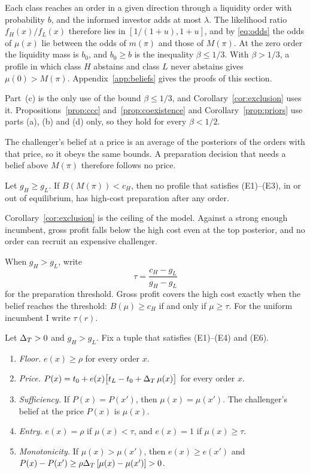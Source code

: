 Each class reaches an order in a given direction through a liquidity order with probability \(b\), and the
informed investor adds at most \(\lambda\). The likelihood ratio \(f_H(x)/f_L(x)\) therefore lies in
\([1/(1+u),1+u]\), and by \eqref{eq:odds} the odds of \(\mu(x)\) lie between the odds of \(m(\pi)\) and those of
\(M(\pi)\). At the zero order the liquidity mass is \(b_0\), and \(b_0\ge b\) is the inequality \(\beta\le1/3\).
With \(\beta>1/3\), a profile in which class \(H\) abstains and class \(L\) never abstains gives \(\mu(0)>M(\pi)\).
Appendix~\ref{app:beliefs} gives the proofs of this section.

Part~(c) is the only use of the bound \(\beta\le1/3\), and Corollary~\ref{cor:exclusion} uses it.
Propositions~\ref{prop:ccc} and~\ref{prop:coexistence} and Corollary~\ref{prop:priors} use parts (a), (b) and (d)
only, so they hold for every \(\beta<1/2\).

The challenger's belief at a price is an average of the posteriors of the orders with that price, so it obeys the
same bounds. A preparation decision that needs a belief above \(M(\pi)\) therefore follows no price.

\begin{corollary}\label{cor:exclusion}
Let \(g_H\ge g_L\). If \(B(M(\pi))<c_H\), then no profile that satisfies (E1)--(E3), in or out of equilibrium,
has high-cost preparation after any order.
\end{corollary}

Corollary~\ref{cor:exclusion} is the ceiling of the model. Against a strong enough incumbent, gross profit falls
below the high cost even at the top posterior, and no order can recruit an expensive challenger.

When \(g_H>g_L\), write
\[
\tau=\frac{c_H-g_L}{g_H-g_L}
\]
for the preparation threshold. Gross profit covers the high cost exactly when the belief reaches the threshold:
\(B(\mu)\ge c_H\) if and only if \(\mu\ge\tau\). For the uniform incumbent I write \(\tau(r)\).

\begin{lemma}\label{lem:prices}
Let \(\Delta_T>0\) and \(g_H>g_L\). Fix a tuple that satisfies (E1)--(E4) and (E6).
\begin{enumerate}[label=(\alph*),leftmargin=2em]
\item \emph{Floor.} \(e(x)\ge\rho\) for every order \(x\).
\item \emph{Price.} \(P(x)=t_0+e(x)\bigl[t_L-t_0+\Delta_T\,\mu(x)\bigr]\) for every order \(x\).
\item \emph{Sufficiency.} If \(P(x)=P(x')\), then \(\mu(x)=\mu(x')\). The challenger's belief at the price \(P(x)\)
is \(\mu(x)\).
\item \emph{Entry.} \(e(x)=\rho\) if \(\mu(x)<\tau\), and \(e(x)=1\) if \(\mu(x)\ge\tau\).
\item \emph{Monotonicity.} If \(\mu(x)>\mu(x')\), then \(e(x)\ge e(x')\) and
\(P(x)-P(x')\ge\rho\Delta_T\,[\mu(x)-\mu(x')]>0\).
\end{enumerate}
\end{lemma}

